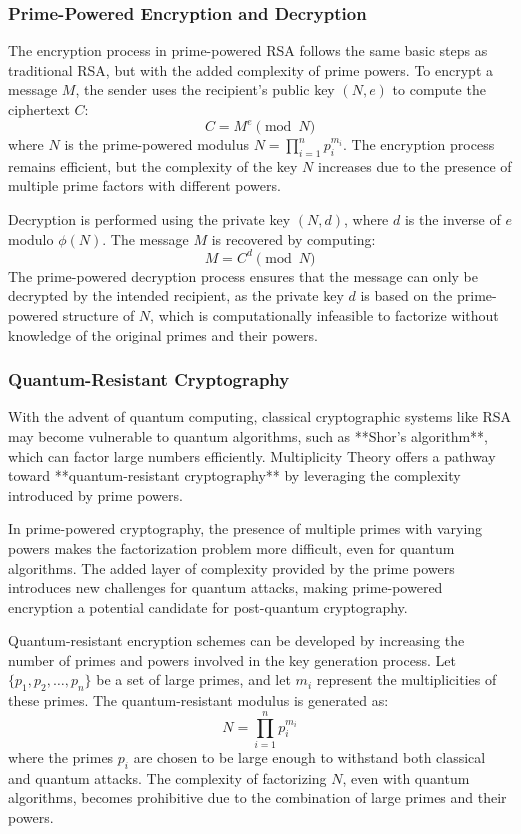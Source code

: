 \documentclass[12pt]{article}
\begin{document}
\subsubsection{Prime-Powered Encryption and Decryption}

The encryption process in prime-powered RSA follows the same basic steps as traditional RSA, but with the added complexity of prime powers. To encrypt a message \( M \), the sender uses the recipient’s public key \( (N, e) \) to compute the ciphertext \( C \):
\[
C = M^e \pmod{N}
\]
where \( N \) is the prime-powered modulus \( N = \prod_{i=1}^{n} p_i^{m_i} \). The encryption process remains efficient, but the complexity of the key \( N \) increases due to the presence of multiple prime factors with different powers.

Decryption is performed using the private key \( (N, d) \), where \( d \) is the inverse of \( e \) modulo \( \phi(N) \). The message \( M \) is recovered by computing:
\[
M = C^d \pmod{N}
\]
The prime-powered decryption process ensures that the message can only be decrypted by the intended recipient, as the private key \( d \) is based on the prime-powered structure of \( N \), which is computationally infeasible to factorize without knowledge of the original primes and their powers.

\subsubsection{Quantum-Resistant Cryptography}

With the advent of quantum computing, classical cryptographic systems like RSA may become vulnerable to quantum algorithms, such as **Shor’s algorithm**, which can factor large numbers efficiently. Multiplicity Theory offers a pathway toward **quantum-resistant cryptography** by leveraging the complexity introduced by prime powers.

In prime-powered cryptography, the presence of multiple primes with varying powers makes the factorization problem more difficult, even for quantum algorithms. The added layer of complexity provided by the prime powers introduces new challenges for quantum attacks, making prime-powered encryption a potential candidate for post-quantum cryptography.

Quantum-resistant encryption schemes can be developed by increasing the number of primes and powers involved in the key generation process. Let \( \{p_1, p_2, \dots, p_n\} \) be a set of large primes, and let \( m_i \) represent the multiplicities of these primes. The quantum-resistant modulus is generated as:
\[
N = \prod_{i=1}^{n} p_i^{m_i}
\]
where the primes \( p_i \) are chosen to be large enough to withstand both classical and quantum attacks. The complexity of factorizing \( N \), even with quantum algorithms, becomes prohibitive due to the combination of large primes and their powers.
\end{document}
